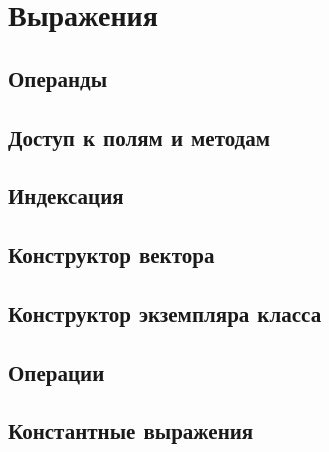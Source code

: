 \hypertarget{expressions}{%
\section{Выражения}\label{expr:chapter}}

\hypertarget{operands}{%
\subsection{Операнды}\label{expr:operands}}

\hypertarget{selector}{%
\subsection{Доступ к полям и методам}\label{expr:selector}}

\hypertarget{indexation}{%
\subsection{Индексация}\label{expr:indexation}}


\hypertarget{vector-composite}{%
\subsection{Конструктор вектора}\label{expr:vector-composite}}

\hypertarget{class-composite}{%
\subsection{Конструктор экземпляра класса}\label{expr:class-composite}}


\hypertarget{operators}{%
\subsection{Операции}\label{expr:operators}}

\hypertarget{const-expr}{%
\subsection{Константные выражения}\label{expr:const-expr}}